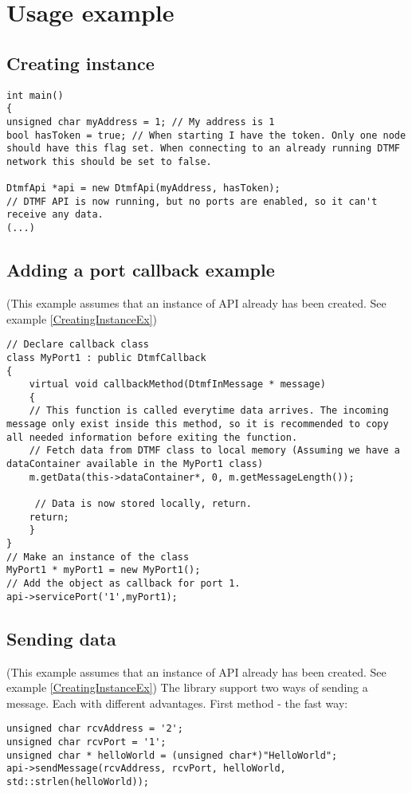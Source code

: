 \chapter{Usage example}
\label{app:usageexample}
\section{Creating instance}
\begin{lstlisting}[language={[ANSI]C++},caption={Creating instance example},label=CreatingInstanceEx]
int main()
{
unsigned char myAddress = 1; // My address is 1
bool hasToken = true; // When starting I have the token. Only one node should have this flag set. When connecting to an already running DTMF network this should be set to false.

DtmfApi *api = new DtmfApi(myAddress, hasToken);
// DTMF API is now running, but no ports are enabled, so it can't receive any data.
(...)
\end{lstlisting}

\section{Adding a port callback example}
(This example assumes that an instance of API already has been created. See example \ref{CreatingInstanceEx})
\begin{lstlisting}[language={[ANSI]C++},caption={Adding a port callback example},label=CreatingCallbackEx]
// Declare callback class
class MyPort1 : public DtmfCallback
{
	virtual void callbackMethod(DtmfInMessage * message)
	{
    // This function is called everytime data arrives. The incoming message only exist inside this method, so it is recommended to copy all needed information before exiting the function.
    // Fetch data from DTMF class to local memory (Assuming we have a dataContainer available in the MyPort1 class)
    m.getData(this->dataContainer*, 0, m.getMessageLength());
    
     // Data is now stored locally, return.
    return;
	}
}
// Make an instance of the class
MyPort1 * myPort1 = new MyPort1();
// Add the object as callback for port 1.
api->servicePort('1',myPort1);
\end{lstlisting}


\section{Sending data}
(This example assumes that an instance of API already has been created. See example \ref{CreatingInstanceEx})
The library support two ways of sending a message. Each with different advantages.
First method - the fast way:
\begin{lstlisting}[language={[ANSI]C++},caption={Sending data example 1},label=SendingDataEx1]
unsigned char rcvAddress = '2';
unsigned char rcvPort = '1';
unsigned char * helloWorld = (unsigned char*)"HelloWorld";
api->sendMessage(rcvAddress, rcvPort, helloWorld, std::strlen(helloWorld));
\end{lstlisting}

